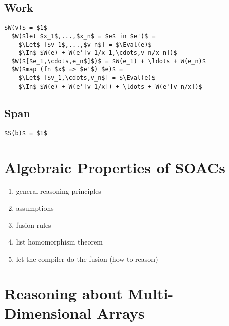 \documentclass[11pt]{book}
\begin{document}



\section{Work}

\newcommand{\Eval}{\mathrm{Eval}}
\newcommand{\Let}{\mathrm{let}}
\newcommand{\In}{\mathrm{in}}
\begin{lstlisting}[mathescape=true]
  $W(v)$ = $1$
  $W($let $x_1$,...,$x_n$ = $e$ in $e')$ =
    $\Let$ [$v_1$,...,$v_n$] = $\Eval(e)$
    $\In$ $W(e) + W(e'[v_1/x_1,\cdots,v_n/x_n])$
  $W($[$e_1,\cdots,e_n$]$)$ = $W(e_1) + \ldots + W(e_n)$
  $W($map (fn $x$ => $e'$) $e)$ =
    $\Let$ [$v_1,\cdots,v_n$] = $\Eval(e)$
    $\In$ $W(e) + W(e'[v_1/x]) + \ldots + W(e'[v_n/x])$
\end{lstlisting}

\section{Span}
\begin{lstlisting}[mathescape=true]
  $S(b)$ = $1$
\end{lstlisting}

\chapter{Algebraic Properties of SOACs}
\label{chap:soac-algebra}

\begin{enumerate}
\item general reasoning principles
\item assumptions
\item fusion rules
\item list homomorphism theorem
\item let the compiler do the fusion (how to reason)
\end{enumerate}

\chapter{Reasoning about Multi-Dimensional Arrays}
\end{document}
